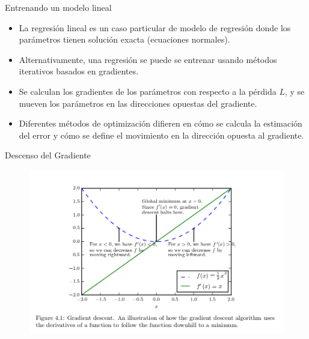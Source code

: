 \documentclass[handout]{beamer}
\begin{document}
\begin{frame}{Entrenando un modelo lineal}
\begin{scriptsize}
\begin{itemize}

\item La regresión lineal es un caso particular de modelo de regresión donde los parámetros tienen solución exacta (ecuaciones normales).

\item Alternativamente, una regresión se puede se entrenar usando métodos iterativos basados en gradientes.


\item Se calculan los gradientes de los parámetros con respecto a la pérdida $L$, y se mueven los parámetros en las direcciones opuestas del gradiente.


\item Diferentes métodos de optimización difieren en cómo se calcula la estimación del error y cómo se define el movimiento en la dirección opuesta al gradiente.

\end{itemize}


\end{scriptsize}
\end{frame}


\begin{frame}{Descenso del Gradiente}
\begin{figure}[htb]
	\centering
	 \includegraphics[scale=0.45]{imagenes/gradientdescent.png}
\end{figure}


\end{frame}
\end{document}
